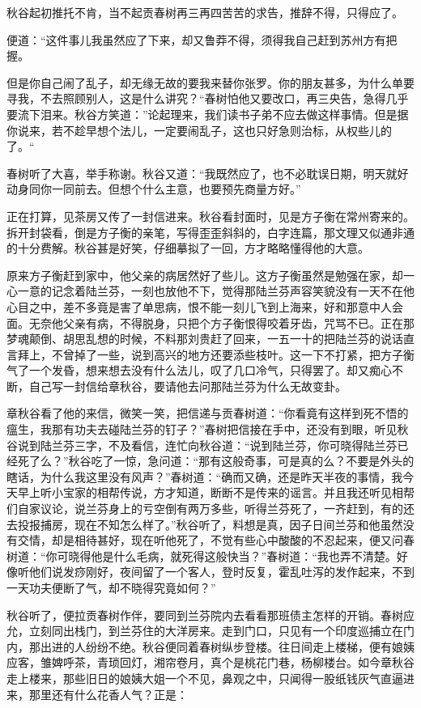 \documentclass[12pt,UTF8]{ctexbook}
\begin{document}
{{{秋谷起初推托不肯，当不起贡春树再三再四苦苦的求告，推辞不得，只得应了。

便道：“这件事儿我虽然应了下来，却又鲁莽不得，须得我自己赶到苏州方有把握。

但是你自己闹了乱子，却无缘无故的要我来替你张罗。你的朋友甚多，为什么单要寻我，不去照顾别人，这是什么讲究？“春树怕他又要改口，再三央告，急得几乎要流下泪来。秋谷方笑道：”论起理来，我们读书子弟不应去做这样事情。但是据你说来，若不趁早想个法儿，一定要闹乱子，这也只好急则治标，从权些儿的了。“

春树听了大喜，举手称谢。秋谷又道：“我既然应了，也不必耽误日期，明天就好动身同你一同前去。但想个什么主意，也要预先商量方好。”

正在打算，见茶房又传了一封信进来。秋谷看封面时，见是方子衡在常州寄来的。拆开封袋看，倒是方子衡的亲笔，写得歪歪斜斜的，白字连篇，那文理又似通非通的十分费解。秋谷甚是好笑，仔细摹拟了一回，方才略略懂得他的大意。

原来方子衡赶到家中，他父亲的病居然好了些儿。这方子衡虽然是勉强在家，却一心一意的记念着陆兰芬，一刻也放他不下，觉得那陆兰芬声容笑貌没有一天不在他心目之中，差不多竟是害了单思病，恨不能一刻儿飞到上海来，好和那意中人会面。无奈他父亲有病，不得脱身，只把个方子衡恨得咬着牙齿，咒骂不已。正在那梦魂颠倒、胡思乱想的时候，不料那刘贵赶了回来，一五一十的把陆兰芬的说话直言拜上，不曾掉了一些，说到高兴的地方还要添些枝叶。这一下不打紧，把方子衡气了一个发昏，想来想去没有什么法儿，叹了几口冷气，只得罢了。却又痴心不断，自己写一封信给章秋谷，要请他去问那陆兰芬为什么无故变卦。

章秋谷看了他的来信，微笑一笑，把信递与贡春树道：“你看竟有这样到死不悟的瘟生，我那有功夫去碰陆兰芬的钉子？”春树把信接在手中，还没有到眼，听见秋谷说到陆兰芬三字，不及看信，连忙向秋谷道：“说到陆兰芬，你可晓得陆兰芬已经死了么？”秋谷吃了一惊，急问道：“那有这般奇事，可是真的么？不要是外头的瞎话，为什么我这里没有风声？”春树道：“确而又确，还是昨天半夜的事情，我今天早上听小宝家的相帮传说，方才知道，断断不是传来的谣言。并且我还听见相帮们自家议论，说兰芬身上的亏空倒有两万多些，听得兰芬死了，一齐赶到，有的还去投报捕房，现在不知怎么样了。”秋谷听了，料想是真，因子日间兰芬和他虽然没有交情，却是相待甚好，现在听他死了，不觉有些心中酸酸的不忍起来，便又问春树道：“你可晓得他是什么毛病，就死得这般快当？”春树道：“我也弄不清楚。好像听他们说发痧刚好，夜间留了一个客人，登时反复，霍乱吐泻的发作起来，不到一天功夫便断了气，却不晓得究竟如何？”

秋谷听了，便拉贡春树作伴，要同到兰芬院内去看看那班债主怎样的开销。春树应允，立刻同出栈门，到兰芬住的大洋房来。走到门口，只见有一个印度巡捕立在门内，那出进的人纷纷不绝。秋谷便同着春树纵步登楼。往日间走上楼梯，便有娘姨应客，雏婢呼茶，青琐回灯，湘帘卷月，真个是桃花门巷，杨柳楼台。如今章秋谷走上楼来，那些旧日的娘姨大姐一个不见，鼻观之中，只闻得一股纸钱灰气直逼进来，那里还有什么花香人气？正是：

}}}
\end{document}
